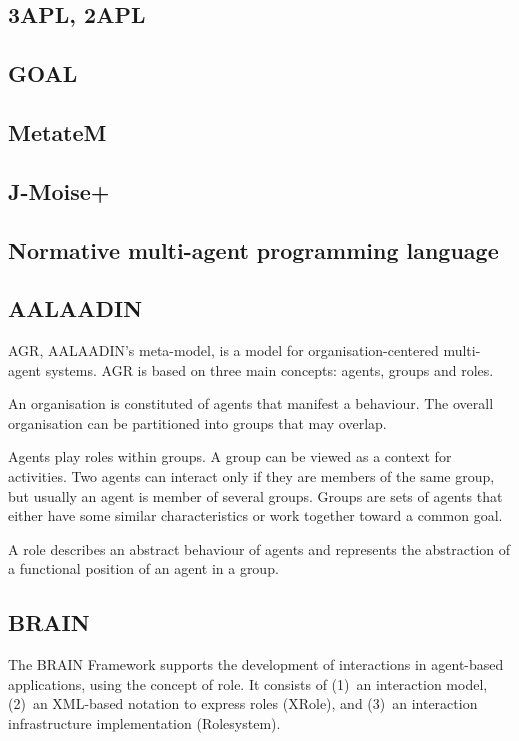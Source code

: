 \documentclass{article}
\begin{document}
\subsection{3APL, 2APL}
\subsection{GOAL}
\subsection{MetateM}
\subsection{J-Moise+}
\subsection{Normative multi-agent programming language}

\subsection{AALAADIN} 
\label{sec:aalaadin}

AGR, AALAADIN's meta-model, is a model for organisation-centered
multi-agent systems. AGR is based on three main concepts: agents,
groups and roles.

An organisation is constituted of agents that manifest a behaviour.
The overall organisation can be partitioned into groups that may
overlap. 

Agents play roles within groups. A group can be viewed as a
context for activities. Two agents can interact only if they are
members of the same group, but usually an agent is member of
several groups. Groups are sets of agents that either have some
similar characteristics or work together toward a common goal.

A role describes an abstract behaviour of agents and represents the
abstraction of a functional position of an agent in a group.

\subsection{BRAIN} 

The BRAIN Framework supports the development of interactions
in agent-based applications, using the concept of role. It
consists of (1)~an interaction model, (2)~an XML-based notation
to express roles (XRole), and (3)~an interaction infrastructure
implementation (Rolesystem).
\end{document}
